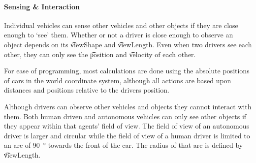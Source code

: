

\paragraph{Sensing \& Interaction} 
Individual vehicles can sense other vehicles and other objects if they are close enough to `see' them. Whether or not a driver is close enough to observe an object depends on its \t{viewShape} and \t{viewLength}. Even when two drivers see each other, they can only see the \t{position} and \t{velocity} of each other.

For ease of programming, most calculations are done using the absolute positions of cars in the world coordinate system, although all actions are based upon distances and positions relative to the drivers position.

Although drivers can observe other vehicles and objects they cannot interact with them. Both human driven and autonomous vehicles can only see other objects if they appear within that agents' field of view. The field of view of an autonomous driver is larger and circular while the field of view of a human driver is limited to an arc of \SI{90}{\degree} towards the front of the car. The radius of that arc is defined by \t{viewLength}.


